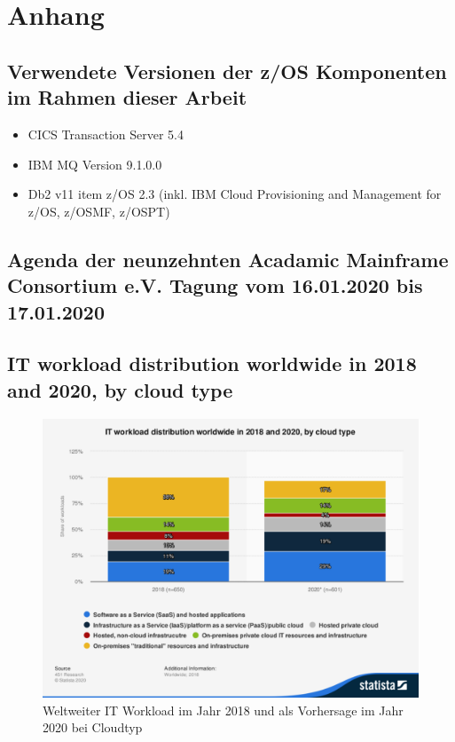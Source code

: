 \chapter{Anhang}\label{app:Anhang}

\section{Verwendete Versionen der z/OS Komponenten im Rahmen dieser Arbeit}
\begin{itemize}
\item CICS Transaction Server 5.4
\item IBM MQ Version 9.1.0.0 
\item Db2 v11
item z/OS 2.3 (inkl. IBM Cloud Provisioning and Management for z/OS, z/OSMF, z/OSPT)
\end{itemize}

\section{Agenda der neunzehnten Acadamic Mainframe Consortium e.V. Tagung vom 16.01.2020 bis 17.01.2020}\label{app:AMC}


\section{IT workload distribution worldwide in 2018 and 2020, by cloud type}
\begin{figure}[ht!]
\centering
\includegraphics[width=\textwidth]{figures/statistic_id748238_it-workload-distribution-globally-2018-and-2020-by-cloud-type.pdf}
\caption{Weltweiter IT Workload im Jahr 2018 und als Vorhersage im Jahr 2020 bei Cloudtyp }
\label{app:itworkload}
\end{figure}

